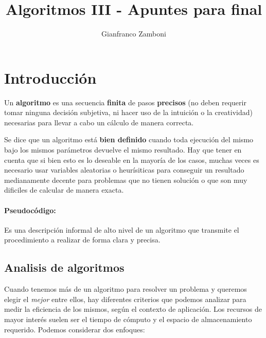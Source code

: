 


\title{Algoritmos III - Apuntes para final}
\author{Gianfranco Zamboni}

\usepackage[backend=biber,style=chem-acs,sorting=none]{biblatex}
\nocite{*}




\setcounter{tocdepth}{3}
	
	
	
	\maketitle
	\tableofcontents

\newpage
\section{Introducción}
Un \textbf{algoritmo} es una secuencia \textbf{finita} de pasos  \textbf{precisos} (no deben requerir tomar ninguna decisión subjetiva, ni hacer uso de la intuición o la creatividad) necesarias para llevar a cabo un cálculo de manera correcta.

Se dice que un algoritmo está \textbf{bien definido} cuando toda ejecución del mismo bajo los mismos parámetros devuelve el mismo resultado. Hay que tener en cuenta que si bien esto es lo deseable en la mayoría de los casos, muchas veces es necesario usar variables aleatorias o heurísiticas para conseguir un resultado medianamente decente para problemas que no tienen solución o que son muy dificiles de calcular de manera exacta.

\paragraph{Pseudocódigo:} Es una descripción informal de alto nivel de un algoritmo que transmite el procedimiento a realizar de forma clara y precisa.

\subsection{Analisis de algoritmos}
Cuando tenemos más de un algoritmo para resolver un problema y queremos elegir el \textit{mejor} entre ellos, hay diferentes criterios que podemos analizar para medir la eficiencia de los mismos, según el contexto de aplicación. Los recursos de mayor interés suelen ser el tiempo de cómputo y el espacio de almacenamiento requerido. Podemos considerar dos enfoques:


